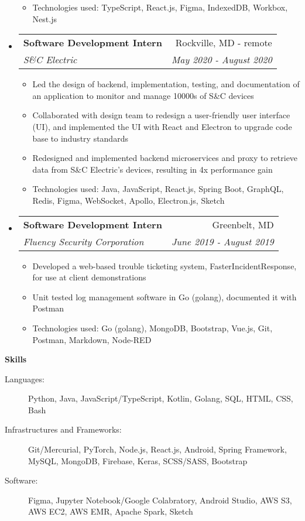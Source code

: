 \documentclass[letterpaper,10pt]{article}
\makeatletter
\newcommand{\resitem}[1]{\item #1 \vspace{-3.5pt}}  %
\newcommand{\resheading}[1]{{\large \colorbox{mygrey}{\begin{minipage}{0.989\textwidth}{\textbf{#1 \vphantom{p\^{E}}}}\end{minipage}}}}
\newcommand{\ressubheading}[4]{
\begin{tabular*}{7.0in}{l@{\extracolsep{\fill}}r}  
		\textbf{#1} & #2 \\
		\textit{#3} & \textit{#4} \\
\end{tabular*}\vspace{-6pt}}  %
\makeatother
\begin{document}
\begin{itemize}
\begin{itemize}
        \resitem{Technologies used: TypeScript, React.js, Figma, IndexedDB, Workbox, Nest.js}
    \end{itemize}
\item
    \ressubheading{Software Development Intern}{Rockville, MD - remote}{S\&C Electric}{May 2020 - August 2020}
    \begin{itemize}
        \resitem{Led the design of backend, implementation, testing, and documentation of an application to monitor and manage 10000s of S\&C devices}
        \resitem{Collaborated with design team to redesign a user-friendly user interface (UI), and implemented the UI with React and Electron to upgrade code base to industry standards}
        \resitem{Redesigned and implemented backend microservices and proxy to retrieve data from S\&C Electric's devices, resulting in 4x performance gain}
        \resitem{Technologies used: Java, JavaScript, React.js, Spring Boot, GraphQL, Redis, Figma, WebSocket, Apollo, Electron.js, Sketch}
    \end{itemize}
\item
    \ressubheading{Software Development Intern}{Greenbelt, MD}{Fluency Security Corporation}{June 2019 - August 2019}
    \begin{itemize}
        \resitem{Developed a web-based trouble ticketing system, FasterIncidentResponse, for use at client demonstrations}
        \resitem{Unit tested log management software in Go (golang), documented it with Postman}
        \resitem{Technologies used: Go (golang), MongoDB, Bootstrap, Vue.js, Git, Postman, Markdown, Node-RED}
    \end{itemize}
\end{itemize}



\resheading{Skills}

\begin{description}
\item[Languages:] Python, Java, JavaScript/TypeScript, Kotlin, Golang, SQL, HTML, CSS, Bash
\item[Infrastructures and Frameworks:] Git/Mercurial, PyTorch, Node.js, React.js, Android, Spring Framework, MySQL, MongoDB, Firebase, Keras, SCSS/SASS, Bootstrap
\item[Software:] Figma, Jupyter Notebook/Google Colabratory, Android Studio, AWS S3, AWS EC2, AWS EMR, Apache Spark, Sketch
\end{description}
\end{document}
